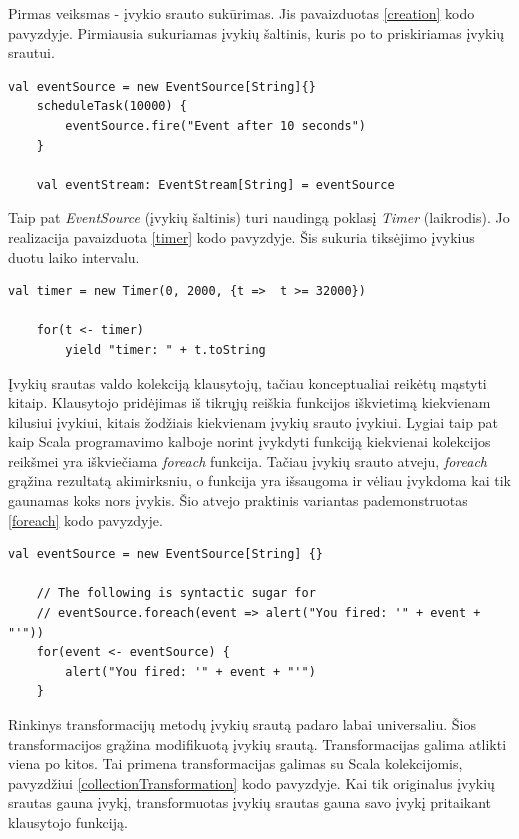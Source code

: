 Pirmas veiksmas - įvykio srauto sukūrimas. Jis pavaizduotas \ref{creation} kodo pavyzdyje.  Pirmiausia sukuriamas įvykių šaltinis, kuris po to priskiriamas įvykių srautui.

\begin{lstlisting}[caption=- įvykių srauto sukūrimas, label=creation]
	val eventSource = new EventSource[String]{}
	scheduleTask(10000) {
		eventSource.fire("Event after 10 seconds")
	}

	val eventStream: EventStream[String] = eventSource
\end{lstlisting}

Taip pat \textit{EventSource} (įvykių šaltinis) turi naudingą poklasį \textit{Timer} (laikrodis). Jo realizacija pavaizduota \ref{timer} kodo pavyzdyje. Šis sukuria tiksėjimo įvykius duotu laiko intervalu.

\begin{lstlisting}[caption=- įvykių srauto sukūrimas, label=timer]
	val timer = new Timer(0, 2000, {t =>  t >= 32000})

	for(t <- timer)
    	yield "timer: " + t.toString
\end{lstlisting}

Įvykių srautas valdo kolekciją klausytojų, tačiau konceptualiai reikėtų mąstyti kitaip. Klausytojo pridėjimas iš tikrųjų reiškia funkcijos iškvietimą kiekvienam kilusiui įvykiui, kitais žodžiais kiekvienam įvykių srauto įvykiui. Lygiai taip pat kaip Scala programavimo kalboje norint įvykdyti funkciją kiekvienai kolekcijos reikšmei yra iškviečiama \textit{foreach} funkcija. Tačiau įvykių srauto atveju, \textit{foreach} grąžina rezultatą akimirksniu, o funkcija yra išsaugoma ir vėliau įvykdoma kai tik gaunamas koks nors įvykis. Šio atvejo praktinis variantas pademonstruotas \ref{foreach} kodo pavyzdyje.

\begin{lstlisting}[caption=- klausytojų pridėjimas, label=foreach]
	val eventSource = new EventSource[String] {}
	  
	// The following is syntactic sugar for
	// eventSource.foreach(event => alert("You fired: '" + event + "'"))
	for(event <- eventSource) {
	 	alert("You fired: '" + event + "'")
	}

\end{lstlisting}

Rinkinys transformacijų metodų įvykių srautą padaro labai universaliu. Šios transformacijos grąžina modifikuotą įvykių srautą. Transformacijas galima atlikti viena po kitos. Tai primena transformacijas galimas su Scala kolekcijomis, pavyzdžiui \ref{collectionTransformation} kodo pavyzdyje. Kai tik originalus įvykių srautas gauna įvykį, transformuotas įvykių srautas gauna savo įvykį pritaikant klausytojo funkciją.


